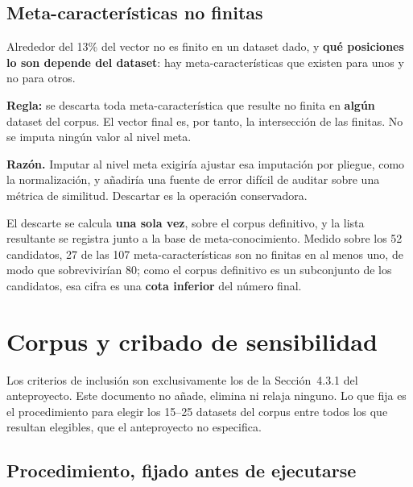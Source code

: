 \documentclass[11pt,letterpaper]{article}
\begin{document}
\subsection{Meta-características no finitas}

Alrededor del 13\% del vector no es finito en un dataset dado, y \textbf{qué
posiciones lo son depende del dataset}: hay meta-características que existen para
unos y no para otros.

\textbf{Regla:} se descarta toda meta-característica que resulte no finita en
\textbf{algún} dataset del corpus. El vector final es, por tanto, la intersección
de las finitas. No se imputa ningún valor al nivel meta.

\textbf{Razón.} Imputar al nivel meta exigiría ajustar esa imputación por pliegue,
como la normalización, y añadiría una fuente de error difícil de auditar sobre una
métrica de similitud. Descartar es la operación conservadora.

El descarte se calcula \textbf{una sola vez}, sobre el corpus definitivo, y la
lista resultante se registra junto a la base de meta-conocimiento. Medido sobre
los 52 candidatos, 27 de las 107 meta-características son no finitas en al menos
uno, de modo que sobrevivirían 80; como el corpus definitivo es un subconjunto de
los candidatos, esa cifra es una \textbf{cota inferior} del número final.

\section{Corpus y cribado de sensibilidad}
\label{sec:corpus}

Los criterios de inclusión son exclusivamente los de la Sección~4.3.1 del
anteproyecto. Este documento no añade, elimina ni relaja ninguno. Lo que fija es
el procedimiento para elegir los 15--25 datasets del corpus entre todos los que
resultan elegibles, que el anteproyecto no especifica.

\subsection{Procedimiento, fijado antes de ejecutarse}
\end{document}
